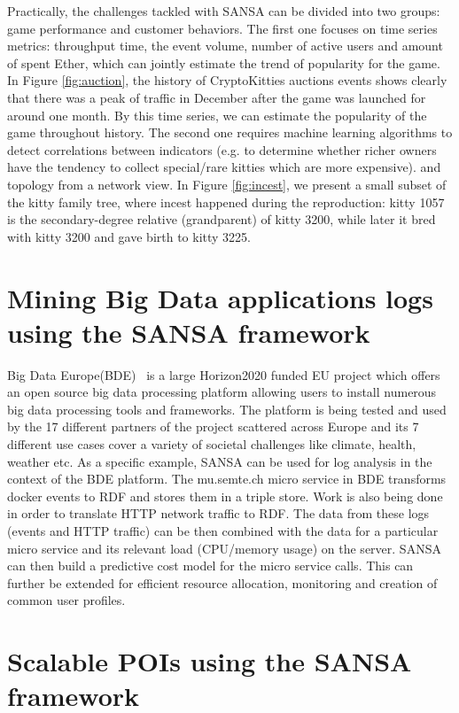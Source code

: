 Practically, the challenges tackled with SANSA can be divided into two groups: game performance and customer behaviors. The first one focuses on time series metrics: throughput time, the event volume, number of active users and amount of spent Ether, which can jointly estimate the trend of popularity for the game. In Figure \ref{fig:auction}, the history of CryptoKitties auctions events shows clearly that there was a peak of traffic in December after the game was launched for around one month. By this time series, we can estimate the popularity of the game throughout history.
The second one requires machine learning algorithms to detect correlations between indicators (e.g. to determine whether richer owners have the tendency to collect special/rare kitties which are more expensive). and topology from a network view. In Figure \ref{fig:incest}, we present a small subset of the kitty family tree, where incest happened during the reproduction: kitty 1057 is the secondary-degree relative (grandparent) of kitty 3200, while later it bred with kitty 3200 and gave birth to kitty 3225.


\section{Mining Big Data applications logs using the SANSA framework}
\label{sec:bde-use-case}
Big Data Europe(BDE)~\cite{Auer+ICWE-2017} is a large Horizon2020 funded EU project which offers an open source big data processing platform allowing users to install numerous big data processing tools and frameworks. 
The platform is being tested and used by the 17 different partners of the project scattered across Europe and its 7 different use cases cover a variety of societal challenges like climate, health, weather etc.
As a specific example, SANSA can be used for log analysis in the context of the BDE platform.
The mu.semte.ch micro service in BDE transforms docker events to RDF and stores them in a triple store.
Work is also being done in order to translate HTTP network traffic to RDF. 
The data from these logs (events and HTTP traffic) can be then combined with the data for a particular micro service and its relevant load (CPU/memory usage) on the server. SANSA can then build a predictive cost model for the micro service calls. This can further be extended for efficient resource allocation, monitoring and creation of common user profiles.

\section{Scalable POIs using the SANSA framework}
\label{sec:slipo-use-case}

